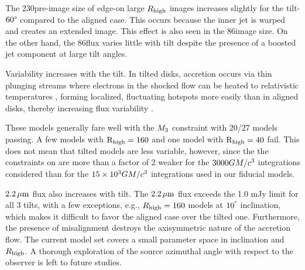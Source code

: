 The 230\GHz pre-image size of edge-on large $R_\mathrm{high}$ images increases slightly for the tilt-$60\degree$ compared to the aligned case. This occurs because the inner jet is warped and creates an extended image. This effect is also seen in the 86\GHz image size. On the other hand, the 86\GHz flux varies little with tilt despite the presence of a boosted jet component at large tilt angles.


Variability increases with the tilt. In tilted disks, accretion occurs via thin plunging streams \citep[e.g.,][]{Fragile2007} where electrons in the shocked flow can be heated to relativistic temperatures \citep[e.g.,][]{Dexter2013, 2014ApJ...780...81G, White2019}, forming localized, fluctuating hotspots more easily than in aligned disks, thereby increasing flux variability \citep{Chatterjee2020, 2021arXiv210412896W}.


These models generally fare well with the $M_{3}$ constraint with 20/27 models passing. A few models with $\rm R_{high}=160$ and one model with $\rm R_{high}=40$ fail.  This does not mean that tilted models are less variable, however, since the the constraints on  are more than a factor of 2 weaker for the $3000GM/c^3$ integrations considered than for the $15 \times 10^3GM/c^3$ integrations used in our fiducial models.

$2.2\,\mu\mathrm{m}$ flux also increases with tilt.  The $2.2\,\mu\mathrm{m}$ flux exceeds the 1.0 mJy limit for all 3 tilts, with a few exceptions, e.g., $R_{\rm high}=160$ models at $10^{\degree}$ inclination, which makes it difficult to favor the aligned case over the tilted one. Furthermore, the presence of misalignment destroys the axisymmetric nature of the accretion flow.  The current model set covers a small parameter space in inclination and $R_{\rm high}$.  A thorough exploration of the source azimuthal angle with respect to the observer is left to future studies.

